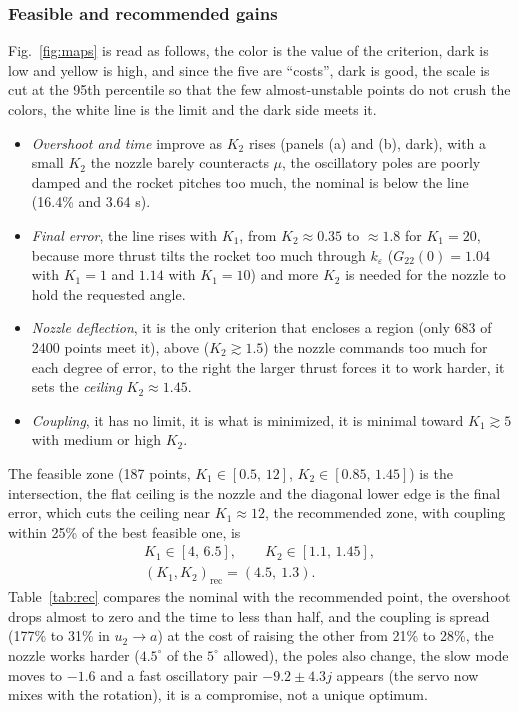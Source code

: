 \documentclass[article, 11pt]{IEEEtran}   %
\begin{document}
\subsubsection{Feasible and recommended gains}
Fig.~\ref{fig:maps} is read as follows, the color is the value of the criterion, dark is low and yellow is high, and since the five are ``costs'', dark is good, the scale is cut at the 95th percentile so that the few almost-unstable points do not crush the colors, the white line is the limit and the dark side meets it.
\begin{itemize}
  \item \emph{Overshoot and time} improve as $K_2$ rises (panels (a) and (b), dark), with a small $K_2$ the nozzle barely counteracts $\mu$, the oscillatory poles are poorly damped and the rocket pitches too much, the nominal is below the line (16.4\% and 3.64 s).
  \item \emph{Final error}, the line rises with $K_1$, from $K_2\approx0.35$ to $\approx1.8$ for $K_1=20$, because more thrust tilts the rocket too much through $k_\varepsilon$ ($G_{22}(0)=1.04$ with $K_1=1$ and $1.14$ with $K_1=10$) and more $K_2$ is needed for the nozzle to hold the requested angle.
  \item \emph{Nozzle deflection}, it is the only criterion that encloses a region (only 683 of 2400 points meet it), above ($K_2\gtrsim1.5$) the nozzle commands too much for each degree of error, to the right the larger thrust forces it to work harder, it sets the \emph{ceiling} $K_2\approx1.45$.
  \item \emph{Coupling}, it has no limit, it is what is minimized, it is minimal toward $K_1\gtrsim5$ with medium or high $K_2$.
\end{itemize}
The feasible zone (187 points, $K_1\in[0.5,\,12]$, $K_2\in[0.85,\,1.45]$) is the intersection, the flat ceiling is the nozzle and the diagonal lower edge is the final error, which cuts the ceiling near $K_1\approx12$, the recommended zone, with coupling within 25\% of the best feasible one, is
\begin{gather}
K_1\in[4,\,6.5],\qquad K_2\in[1.1,\,1.45],\nonumber\\
(K_1,K_2)_{\text{rec}}=(4.5,\ 1.3).
\end{gather}
Table~\ref{tab:rec} compares the nominal with the recommended point, the overshoot drops almost to zero and the time to less than half, and the coupling is spread (177\% to 31\% in $u_2\to a$) at the cost of raising the other from 21\% to 28\%, the nozzle works harder ($4.5^\circ$ of the $5^\circ$ allowed), the poles also change, the slow mode moves to $-1.6$ and a fast oscillatory pair $-9.2\pm4.3j$ appears (the servo now mixes with the rotation), it is a compromise, not a unique optimum.
\end{document}
